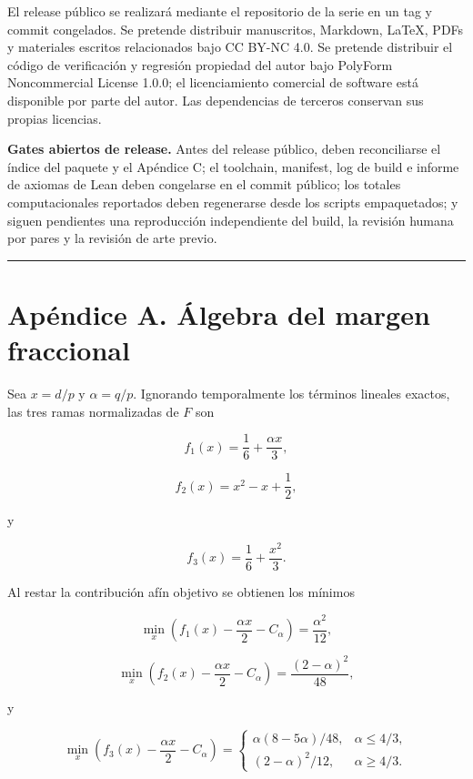 \documentclass[
  11pt,
]{article}
\begin{document}
El release público se realizará mediante el repositorio de la serie en un tag y commit congelados. Se pretende distribuir manuscritos, Markdown, LaTeX, PDFs y materiales escritos relacionados bajo CC BY-NC 4.0. Se pretende distribuir el código de verificación y regresión propiedad del autor bajo PolyForm Noncommercial License 1.0.0; el licenciamiento comercial de software está disponible por parte del autor. Las dependencias de terceros conservan sus propias licencias.

\textbf{Gates abiertos de release.} Antes del release público, deben reconciliarse el índice del paquete y el Apéndice C; el toolchain, manifest, log de build e informe de axiomas de Lean deben congelarse en el commit público; los totales computacionales reportados deben regenerarse desde los scripts empaquetados; y siguen pendientes una reproducción independiente del build, la revisión humana por pares y la revisión de arte previo.

\begin{center}\rule{0.5\linewidth}{0.5pt}\end{center}

\section{Apéndice A. Álgebra del margen fraccional}\label{apuxe9ndice-a.-uxe1lgebra-del-margen-fraccional}

Sea \(x=d/p\) y \(\alpha=q/p\). Ignorando temporalmente los términos lineales exactos, las tres ramas normalizadas de \(F\) son

\[
f_1(x)=\frac16+\frac{\alpha x}{3},
\]

\[
f_2(x)=x^2-x+\frac12,
\]

y

\[
f_3(x)=\frac16+\frac{x^2}{3}.
\]

Al restar la contribución afín objetivo se obtienen los mínimos

\[
\min_x\left(f_1(x)-\frac{\alpha x}{2}-C_\alpha\right)
=
\frac{\alpha^2}{12},
\]

\[
\min_x\left(f_2(x)-\frac{\alpha x}{2}-C_\alpha\right)
=
\frac{(2-\alpha)^2}{48},
\]

y

\[
\min_x\left(f_3(x)-\frac{\alpha x}{2}-C_\alpha\right)
=
\begin{cases}
\alpha(8-5\alpha)/48,&\alpha\le4/3,\\
(2-\alpha)^2/12,&\alpha\ge4/3.
\end{cases}
\]
\end{document}
